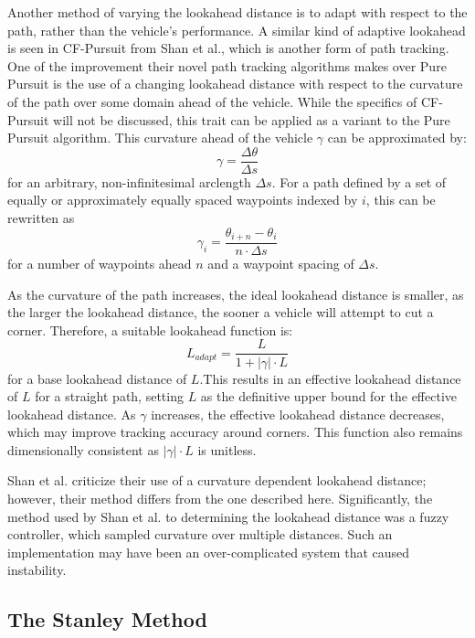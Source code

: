 \documentclass[mla8alt]{mla}
\begin{document}
\begin{paper}
Another method of varying the lookahead distance is to adapt with respect to the path, rather than the vehicle's performance. A similar kind of adaptive lookahead is seen in CF-Pursuit from Shan et al., which is another form of path tracking. One of the improvement their novel path tracking algorithms makes over Pure Pursuit is the use of a changing lookahead distance with respect to the curvature of the path over some domain ahead of the vehicle. While the specifics of CF-Pursuit will not be discussed, this trait can be applied as a variant to the Pure Pursuit algorithm. This curvature ahead of the vehicle $\gamma$ can be approximated by: 
\begin{equation*}
\gamma = \frac{\Delta\theta}{\Delta s}
\end{equation*}
for an arbitrary, non-infinitesimal arclength $\Delta s$. For a path defined by a set of equally or approximately equally spaced waypoints indexed by $i$, this can be rewritten as
\begin{equation}
\gamma_i = \frac{\theta_{i+n}-\theta_i}{n \cdot \Delta s}
\end{equation}
for a number of waypoints ahead $n$ and a waypoint spacing of $\Delta s$.

As the curvature of the path increases, the ideal lookahead distance is smaller, as the larger the lookahead distance, the sooner a vehicle will attempt to cut a corner. Therefore, a suitable lookahead function is:
\begin{equation}
L_{adapt} = \frac{L}{1+|\gamma| \cdot L}
\end{equation}
for a base lookahead distance of $L$.This results in an effective lookahead distance of $L$ for a straight path, setting $L$ as the definitive upper bound for the effective lookahead distance. As $\gamma$ increases, the effective lookahead distance decreases, which may improve tracking accuracy around corners. This function also remains dimensionally consistent as $|\gamma| \cdot L$ is unitless.

Shan et al. criticize their use of a curvature dependent lookahead distance; however, their method differs from the one described here. Significantly, the method used by Shan et al. to determining the lookahead distance was a fuzzy controller, which sampled curvature over multiple distances. Such an implementation may have been an over-complicated system that caused instability.


\subsection{The Stanley Method}


\end{paper}
\end{document}
